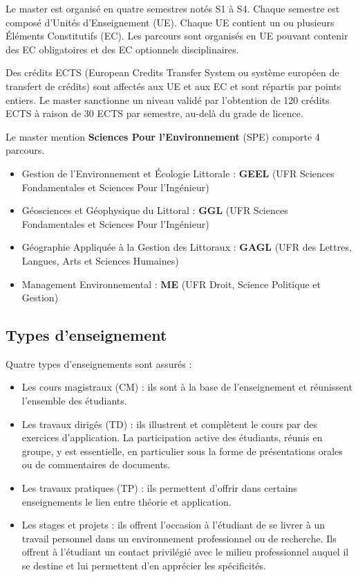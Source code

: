 \documentclass[a4paper,11pt]{article}
\begin{document}
Le master est organisé en quatre semestres notés S1 à S4. Chaque semestre est composé d'Unités d'Enseignement (UE). Chaque UE contient un ou plusieurs Éléments Constitutifs (EC). Les parcours sont organisés en UE pouvant contenir des EC obligatoires et des EC optionnels disciplinaires.

Des crédits ECTS (European Credits Transfer System ou système européen de transfert de crédits) sont affectés aux UE et aux EC et sont répartis par points entiers. Le master sanctionne un niveau validé par l'obtention de 120 crédits ECTS à raison de 30 ECTS par semestre, au-delà du grade de licence.

Le master mention \textbf{Sciences Pour l'Environnement} (SPE) comporte 4 parcours.
\begin{itemize}
\item Gestion de l'Environnement et Écologie Littorale : \textbf{GEEL} (UFR Sciences Fondamentales et Sciences Pour l'Ingénieur)
\item Géosciences et Géophysique du Littoral : \textbf{GGL} (UFR Sciences Fondamentales et Sciences Pour l'Ingénieur)
\item Géographie Appliquée à la Gestion des Littoraux : \textbf{GAGL} (UFR des Lettres, Langues, Arts et Sciences Humaines)
\item Management Environnemental : \textbf{ME} (UFR Droit, Science Politique et Gestion)
\end{itemize}

\subsection{Types d'enseignement}\label{TypesEnseignements}

Quatre types d'enseignements sont assurés :
\begin{itemize}
\item Les cours magistraux (CM) : ils sont à la base de l'enseignement et réunissent l'ensemble des étudiants.
\item Les travaux dirigés (TD) : ils illustrent et complètent le cours par des exercices d'application. La participation active des étudiants, réunis en groupe, y est essentielle, en particulier sous la forme de présentations orales ou de commentaires de documents.
\item Les travaux pratiques (TP) : ils permettent d'offrir dans certains enseignements le lien entre théorie et application.
\item Les stages et projets : ils offrent l'occasion à l'étudiant de se livrer à un travail personnel dans un environnement professionnel ou de recherche. Ils offrent à l'étudiant un contact privilégié avec le milieu professionnel auquel il se destine et lui permettent d'en apprécier les spécificités.
\end{itemize}
\end{document}
